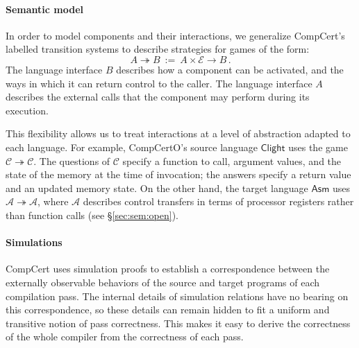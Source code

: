 \documentclass[sigplan,10pt,review]{acmart}
\newcommand{\kw}[1]{\ensuremath{ \mathsf{#1} }}
\begin{document}
\paragraph{Semantic model} %

In order to model components and their interactions,
we generalize CompCert's labelled transition systems
to describe strategies for games of the form:
\[ A \twoheadrightarrow B \: := \:
   A \times \mathcal{E} \rightarrow B \,. \]
The language interface $B$ describes how a component can be activated,
and the ways in which it can return control to the caller.
The language interface $A$ describes the external calls that the component
may perform during its execution.

This flexibility allows us to treat interactions
at a level of abstraction adapted to each language.
For example, CompCertO's source language \kw{Clight} uses the game
\mbox{$\mathcal{C} \twoheadrightarrow \mathcal{C}$}.
The questions of $\mathcal{C}$ specify a function to call,
argument values,
and the state of the memory at the time of invocation;
the answers specify a return value and an updated memory state.
On the other hand, the target language \kw{Asm} uses
$\mathcal{A} \twoheadrightarrow \mathcal{A}$,
where $\mathcal{A}$ describes control transfers
in terms of processor registers
rather than function calls (see \S\ref{sec:sem:open}).



\paragraph{Simulations} %

CompCert uses simulation proofs
to establish a correspondence between
the externally observable behaviors of
the source and target programs of each compilation pass.
The internal details of simulation relations
have no bearing on this correspondence,
so these details can remain hidden
to fit a uniform and transitive notion of pass correctness.
This makes it easy to derive the correctness
of the whole compiler
from the correctness of each pass.
\end{document}
